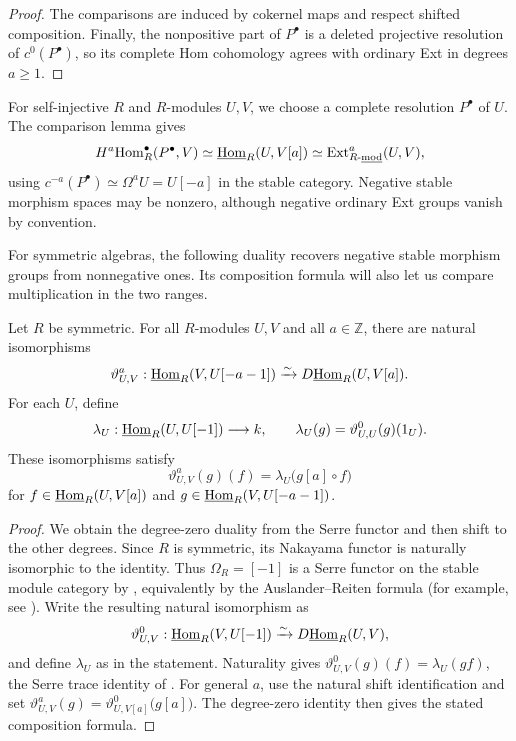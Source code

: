 \documentclass[11pt]{article}
\begin{document}
\begin{proof}
The comparisons are induced by cokernel maps and respect shifted
composition. Finally, the nonpositive part of $P^\bullet$ is a deleted projective resolution of
$c^0(P^\bullet)$, so its complete Hom cohomology agrees with
ordinary Ext in degrees $a\ge1$.
\end{proof}

\begin{Rem}
For self-injective $R$ and $R$-modules $U,V$, we choose a complete
resolution $P^\bullet$ of $U$. The comparison lemma gives
\[
 H^a{\rm Hom}_R^\bullet(P^\bullet,V)\simeq\underline{{\rm Hom}}_R(U,V[a])
 \simeq{\rm Ext}_{R\text{-}\underline{\mathrm{mod}}}^a(U,V),
\]
using $c^{-a}(P^\bullet)\simeq\Omega^aU=U[-a]$ in the stable category.
Negative stable morphism spaces may be nonzero, although
negative ordinary Ext groups vanish by convention.
\end{Rem}


For symmetric algebras, the following duality recovers negative stable
morphism groups from nonnegative ones. Its composition formula will
also let us compare multiplication in the two ranges.

\begin{Lem}\label{tool:duality}
Let $R$ be symmetric. For all $R$-modules $U,V$ and all
$a\in\mathbb Z$, there are natural isomorphisms
\[
 \vartheta^a_{U,V}:\underline{{\rm Hom}}_R(V,U[-a-1])
 \xrightarrow{\sim}D\underline{{\rm Hom}}_R(U,V[a]).
\]
For each $U$, define
\[
 \lambda_U:\underline{{\rm Hom}}_R(U,U[-1])\longrightarrow k,
 \qquad \lambda_U(g)=\vartheta^0_{U,U}(g)(1_U).
\]
These isomorphisms satisfy
\[
 \vartheta^a_{U,V}(g)(f)
   =\lambda_U\bigl(g[a]\circ f\bigr)
\]
for $f\in\underline{{\rm Hom}}_R(U,V[a])$ and
$g\in\underline{{\rm Hom}}_R(V,U[-a-1])$.
\end{Lem}
\begin{proof}
We obtain the degree-zero duality from the Serre functor and then
shift to the other degrees. Since $R$ is symmetric, its Nakayama
functor is naturally isomorphic to the identity. Thus $\Omega_R=[-1]$ is a Serre functor
on the stable module category by \cite[Proposition~6.4.2]{KrauseHTR}, equivalently by the
Auslander--Reiten formula (for example, see \cite[Proposition~6.3.5]{KrauseHTR}).
Write the resulting natural isomorphism as
\[
 \vartheta^0_{U,V}:\underline{{\rm Hom}}_R(V,U[-1])
 \xrightarrow{\sim}D\underline{{\rm Hom}}_R(U,V),
\]
and define $\lambda_U$ as in the statement. Naturality gives
$\vartheta^0_{U,V}(g)(f)=\lambda_U(gf)$, the Serre trace identity
of \cite[Lemma~6.3.1]{KrauseHTR}.
For general $a$, use the natural shift identification and set
$\vartheta^a_{U,V}(g)=\vartheta^0_{U,V[a]}\bigl(g[a]\bigr)$.
The degree-zero identity then gives the stated composition formula.
\end{proof}
\end{document}
